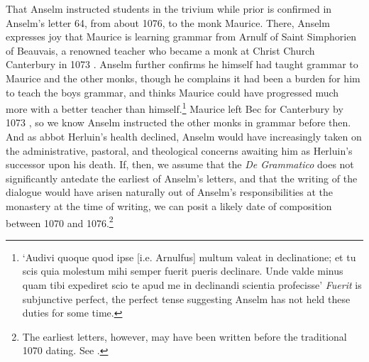 \documentclass[]{article}
\begin{document}
That Anselm instructed students in the trivium while prior is confirmed in Anselm's letter 64, from about 1076, to the monk Maurice. There, Anselm expresses joy that Maurice is learning grammar from Arnulf of Saint Simphorien of Beauvais, a renowned teacher who became a monk at Christ Church Canterbury in 1073 \cite[See Ep. 38]{Anselm1990}. Anselm further confirms he himself had taught grammar to Maurice and the other monks, though he complains it had been a burden for him to teach the boys grammar, and thinks Maurice could have progressed much more with a better teacher than himself.\footnote{`Audivi quoque quod ipse [i.e. Arnulfus] multum valeat in declinatione; et tu scis quia molestum mihi semper fuerit pueris declinare. Unde valde minus quam tibi expediret scio te apud me in declinandi scientia profecisse' \cite[v. 158, 1124C]{PL} \textit{Fuerit} is subjunctive perfect, the perfect tense suggesting Anselm has not held these duties for some time.} Maurice left Bec for Canterbury by 1073 \cite[Ep. 33-36]{Anselm1990}, so we know Anselm instructed the other monks in grammar before then. And as abbot Herluin's health declined, Anselm would have increasingly taken on the administrative, pastoral, and theological concerns awaiting him as Herluin's successor upon his death. If, then, we assume that the \textit{De Grammatico} does not significantly antedate the earliest of Anselm's letters, and that the writing of the dialogue would have arisen naturally out of Anselm's responsibilities at the monastery at the time of writing, we can posit a likely date of composition between 1070 and 1076.\footnote{The earliest letters, however, may have been written before the traditional 1070 dating. See \cite[11-15]{Sharpe2009}.}
\end{document}
